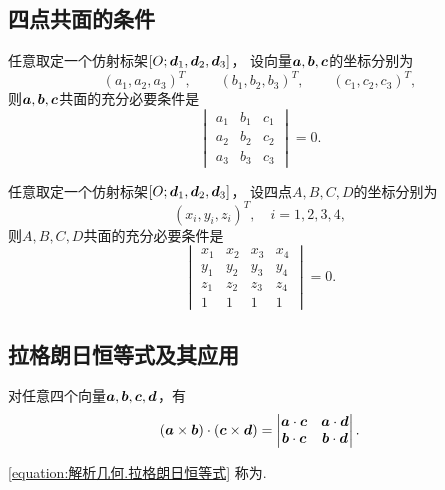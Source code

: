 \subsection{四点共面的条件}
\begin{theorem}
任意取定一个仿射标架\([O;\boldsymbol{d}_1,\boldsymbol{d}_2,\boldsymbol{d}_3]\)，
设向量\(\boldsymbol{a},\boldsymbol{b},\boldsymbol{c}\)的坐标分别为\begin{equation*}
	(a_1,a_2,a_3)^T, \qquad
	(b_1,b_2,b_3)^T, \qquad
	(c_1,c_2,c_3)^T,
\end{equation*}
则\(\boldsymbol{a},\boldsymbol{b},\boldsymbol{c}\)共面的充分必要条件是\begin{equation*}
	\begin{vmatrix}
		a_1 & b_1 & c_1 \\
		a_2 & b_2 & c_2 \\
		a_3 & b_3 & c_3
	\end{vmatrix} = 0.
\end{equation*}
\end{theorem}

\begin{corollary}
任意取定一个仿射标架\([O;\boldsymbol{d}_1,\boldsymbol{d}_2,\boldsymbol{d}_3]\)，
设四点\(A,B,C,D\)的坐标分别为\begin{equation*}
	(x_i,y_i,z_i)^T,
	\quad i=1,2,3,4,
\end{equation*}
则\(A,B,C,D\)共面的充分必要条件是\begin{equation*}
	\begin{vmatrix}
		x_1 & x_2 & x_3 & x_4 \\
		y_1 & y_2 & y_3 & y_4 \\
		z_1 & z_2 & z_3 & z_4 \\
		1 & 1 & 1 & 1
	\end{vmatrix} = 0.
\end{equation*}
\end{corollary}

\subsection{拉格朗日恒等式及其应用}
\begin{theorem}
对任意四个向量\(\boldsymbol{a},\boldsymbol{b},\boldsymbol{c},\boldsymbol{d}\)，有
\begin{equation}\label{equation:解析几何.拉格朗日恒等式}
	(\boldsymbol{a}\times\boldsymbol{b})\cdot(\boldsymbol{c}\times\boldsymbol{d})
	= \begin{vmatrix}
		\boldsymbol{a}\cdot\boldsymbol{c} & \boldsymbol{a}\cdot\boldsymbol{d} \\
		\boldsymbol{b}\cdot\boldsymbol{c} & \boldsymbol{b}\cdot\boldsymbol{d}
	\end{vmatrix}.
\end{equation}
\end{theorem}
\cref{equation:解析几何.拉格朗日恒等式}
称为.

